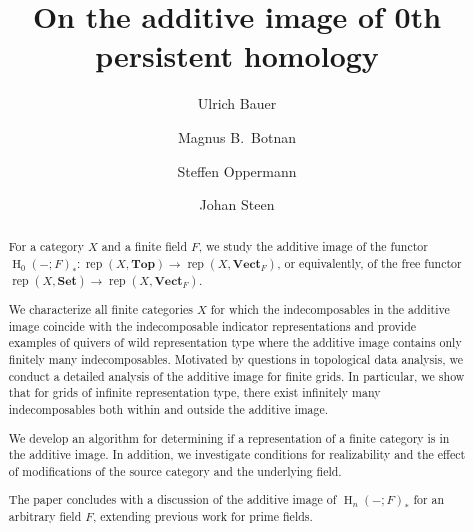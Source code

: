 \documentclass[a4paper]{amsart}
\title{On the additive image of 0th persistent homology}
\author{Ulrich Bauer}
\author{Magnus B.\ Botnan}
\author{Steffen Oppermann}
\author{Johan Steen}
\theoremstyle{plain}
\theoremstyle{definition}
\theoremstyle{remark}
\newcommand{\Top}{\mathbf{Top}}
\newcommand{\Set}{\mathbf{Set}}
\newcommand{\VectF}{\mathbf{Vect}_F}
\DeclareMathOperator{\rep}{rep}
\begin{document}
\begin{abstract}
For a category $X$ and a finite field $F$, we study the additive image of the functor $\operatorname{H}_0(-;F)_* \colon \rep(X, \Top) \to \rep(X, \VectF)$,
or equivalently, of the free functor $\rep(X, \Set) \to \rep(X, \VectF)$.


We characterize all finite categories \( X \) for which the indecomposables in the additive image coincide with the indecomposable indicator representations and provide examples of quivers of wild representation type where the additive image contains only finitely many indecomposables. Motivated by questions in topological data analysis, we conduct a detailed analysis of the additive image for finite grids. In particular, we show that for grids of infinite representation type, there exist infinitely many indecomposables both within and outside the additive image.

We develop an algorithm for determining if a representation of a finite category is in the additive image. In addition, we investigate conditions for realizability and the effect of modifications of the source category and the underlying field. 

The paper concludes with a discussion of the additive image of $\operatorname{H}_n(-;F)_*$ for an arbitrary field $F$, extending previous work for prime fields.


\end{abstract}
\maketitle
\end{document}
